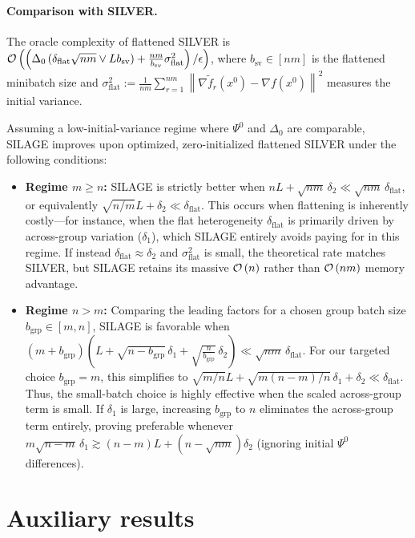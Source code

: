 \documentclass{article}
\newcommand{\sqn}[1]{\left\| #1 \right\|^2}
\newcommand{\cO}{{\cal O}}
\newcommand{\eqdef}{:=}
\newcommand{\rb}[1]{\left(#1\right)}
\theoremstyle{plain}
\newcommand{\algname}[1]{{\sf\scalefont{0.88}\color{mydarkgreen}#1}\xspace}
\newcommand{\algno}{{\sf\scalefont{0.88}\color{mydarkgreen}SILAGE}\xspace}
\def\algname#1{#1}%
\begin{document}
\paragraph{Comparison with \algname{SILVER}.}
The oracle complexity of flattened \algname{SILVER} is $\cO\rb{\rb{\Delta_0\rb{\delta_{\mathrm{flat}}\sqrt{nm}\vee Lb_{\mathrm{sv}}}+\frac{nm}{b_{\mathrm{sv}}}\sigma_{\mathrm{flat}}^2} / \epsilon}$, where $b_{\mathrm{sv}}\in[nm]$ is the flattened minibatch size and $\sigma_{\mathrm{flat}}^2 \eqdef \frac{1}{nm}\sum_{r=1}^{nm}\sqn{\nabla \tilde f_r(x^0)-\nabla f(x^0)}$ measures the initial variance.

Assuming a low-initial-variance regime where $\Psi^0$ and $\Delta_0$ are comparable, \algno improves upon optimized, zero-initialized flattened \algname{SILVER} under the following conditions:
\begin{itemize}[leftmargin=*]
    \item \textbf{Regime $m \ge n$:} \algno is strictly better when $nL+\sqrt{nm}\,\delta_2 \ll \sqrt{nm}\,\delta_{\mathrm{flat}}$, or equivalently $\sqrt{n/m}L+\delta_2 \ll \delta_{\mathrm{flat}}$. This occurs when flattening is inherently costly---for instance, when the flat heterogeneity $\delta_{\mathrm{flat}}$ is primarily driven by across-group variation ($\delta_1$), which \algno entirely avoids paying for in this regime. If instead $\delta_{\mathrm{flat}} \approx \delta_2$ and $\sigma_{\mathrm{flat}}^2$ is small, the theoretical rate matches \algname{SILVER}, but \algno retains its massive $\cO\rb{n}$ rather than $\cO\rb{nm}$ memory advantage.
    \item \textbf{Regime $n > m$:} Comparing the leading factors for a chosen group batch size $b_{\mathrm{grp}}\in[m,n]$, \algno is favorable when $\rb{m+b_{\mathrm{grp}}}\rb{L+\sqrt{n-b_{\mathrm{grp}}}\,\delta_1+\sqrt{\tfrac{n}{b_{\mathrm{grp}}}}\,\delta_2} \ll \sqrt{nm}\,\delta_{\mathrm{flat}}$. For our targeted choice $b_{\mathrm{grp}}=m$, this simplifies to $\sqrt{m/n}L + \sqrt{m(n-m)/n}\,\delta_1 + \delta_2 \ll \delta_{\mathrm{flat}}$. Thus, the small-batch choice is highly effective when the scaled across-group term is small. If $\delta_1$ is large, increasing $b_{\mathrm{grp}}$ to $n$ eliminates the across-group term entirely, proving preferable whenever $m\sqrt{n-m}\,\delta_1 \gtrsim (n-m)L+(n-\sqrt{nm})\delta_2$ (ignoring initial $\Psi^0$ differences).
\end{itemize}

\newpage

\section{Auxiliary results}
\end{document}
